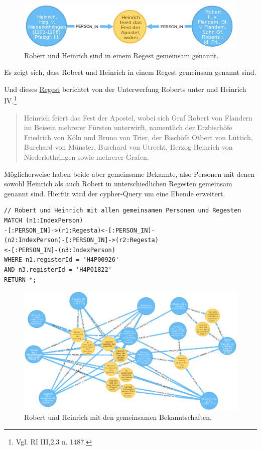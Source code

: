 \documentclass[ngerman,]{scrreprt}
\begin{document}
\begin{figure}
\centering
\includegraphics{Bilder/RI2Graph/RobertundHeinrich.png}
\caption{Robert und Heinrich sind in einem Regest gemeinsam genannt.}
\end{figure}

Es zeigt sich, dass Robert und Heinrich in einem Regest gemeinsam genannt sind.

Und dieses \href{http://www.regesta-imperii.de/id/cf75356b-bd0d-4a67-8aeb-3ae27d1dcefa}{Regest} berichtet von der Unterwerfung Roberts unter und Heinrich IV.\footnote{Vgl. RI III,2,3 n. 1487.}

\begin{quote}
Heinrich feiert das Fest der Apostel, wobei sich Graf Robert von Flandern im Beisein mehrerer Fürsten unterwirft, namentlich der Erzbischöfe Friedrich von Köln und Bruno von Trier, der Bischöfe Otbert von Lüttich, Burchard von Münster, Burchard von Utrecht, Herzog Heinrich von Niederlothringen sowie mehrerer Grafen.
\end{quote}

Möglicherweise haben beide aber gemeinsame Bekannte, also Personen mit denen sowohl Heinrich als auch Robert in unterschiedlichen Regesten gemeinsam genannt sind. Hierfür wird der cypher-Query um eine Ebende erweitert.

\begin{verbatim}
// Robert und Heinrich mit allen gemeinsamen Personen und Regesten
MATCH (n1:IndexPerson)
-[:PERSON_IN]->(r1:Regesta)<-[:PERSON_IN]-
(n2:IndexPerson)-[:PERSON_IN]->(r2:Regesta)
<-[:PERSON_IN]-(n3:IndexPerson)
WHERE n1.registerId = 'H4P00926'
AND n3.registerId = 'H4P01822'
RETURN *;
\end{verbatim}

\begin{figure}
\centering
\includegraphics{Bilder/RI2Graph/RobertundHeinrichMitBrokern.png}
\caption{Robert und Heinrich mit den gemeinsamen Bekanntschaften.}
\end{figure}
\end{document}
